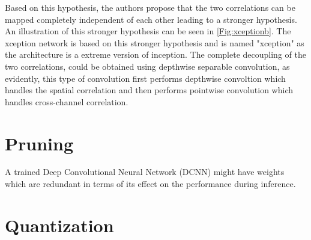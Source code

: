 Based on this hypothesis, the authors propose that the two correlations can be mapped completely independent of each other leading to a stronger hypothesis. An illustration of this stronger hypothesis can be seen in \ref{Fig:xceptionb}. The xception network is based on this stronger hypothesis and is named "xception" as the architecture is a extreme version of inception. The complete decoupling of the two correlations, could be obtained using depthwise separable convolution, as evidently, this type of convolution first performs depthwise convoltion which handles the spatial correlation and then performs pointwise convolution which handles cross-channel correlation.

\section{Pruning}

A trained Deep Convolutional Neural Network (DCNN) might have weights which are redundant in terms of its effect on the performance during inference.

\section{Quantization}
